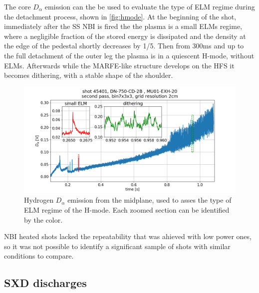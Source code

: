 The core $D_{\alpha}$ emission can the be used to evaluate the type of ELM regime during the detachment process, shown in \autoref{fig:hmode}. At the beginning of the shot, immediately after the SS NBI is fired the the plasma is a small ELMs regime, where a negligible fraction of the stored energy is dissipated and the density at the edge of the pedestal shortly decreases by 1/5. Then from 300ms and up to the full detachment of the outer leg the plasma is in a quiescent H-mode, without ELMs. Afterwards while the MARFE-like structure develops on the HFS it becomes dithering, with a stable shape of the shoulder.


\begin{figure}
	\centering
	\includegraphics[trim={40 0 80 50},clip,width=0.9\linewidth]{Chapters/chapter2/figs/IRVB-MASTU_shot-45401_pass1_bin7x3x3_gridres2cm_all_variables_absolute_small4.png}
	\caption{Hydrogen $D_{\alpha}$ emission from the midplane, used to asses the type of ELM regime of the H-mode. Each zoomed section can be identified by the color.}
	\label{fig:hmode}
\end{figure}

NBI heated shots lacked the repeatability that was ahieved with low power ones, so it was not possible to identify a significant sample of shots with similar conditions to compare.


\subsection{SXD discharges}

